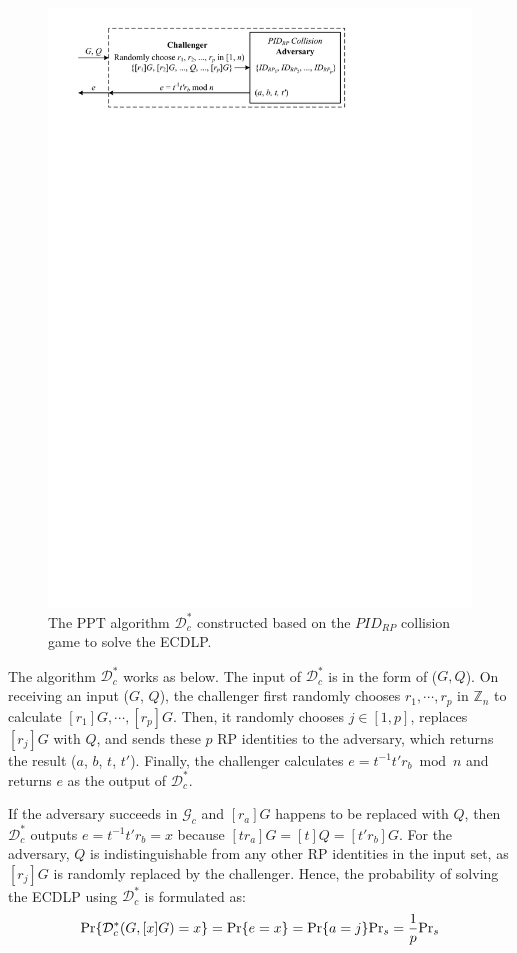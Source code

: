 \begin{figure}[tb]
  \centering
  \includegraphics[width=0.96\linewidth]{fig/ecdlp_algorithm.pdf}
  \caption{The PPT algorithm $\mathcal{D}^*_c$ constructed based on the $PID_{RP}$ collision game to solve the ECDLP.}
  \label{fig:ecdlp_algorithm}
\end{figure}

The algorithm $\mathcal{D}^*_c$ works as below.
The input of $\mathcal{D}^*_c$ is in the form of ($G, Q$). On receiving an input ($G$, $Q$), the challenger first randomly chooses $r_1, \cdots, r_p$ in $\mathbb{Z}_n$ to calculate $[r_1]G, \cdots, [r_p]G$.
Then, it randomly chooses $j \in [1,p]$, replaces $[r_j]G$ with $Q$, and sends these $p$ RP identities to the adversary, which returns the result ($a$, $b$, $t$, $t'$).
Finally, the challenger calculates $e = t^{-1}t'r_b \bmod n$ and returns $e$ as the output of $\mathcal{D}^*_c$.

If the adversary succeeds in $\mathcal{G}_c$ and $[r_a]G$ happens to be replaced with $Q$, then $\mathcal{D}^*_c$ outputs $e=t^{-1}t'r_b =x$ because $[tr_a]G = [t]Q = [t'r_b]G$. For the adversary, $Q$ is indistinguishable from any other RP identities in the input set, as $[r_j]G$ is randomly replaced by the challenger.
Hence, the probability of solving the ECDLP using $\mathcal{D}^*_c$ is formulated as:
\begin{equation*}
{\rm Pr}\{\mathcal{D}^*_c(G, [x]G)=x\} = {\rm Pr}\{e = x\}={\rm Pr}\{a=j\}{\rm Pr}_s=\frac{1}{p}{\rm Pr}_s
\end{equation*}

